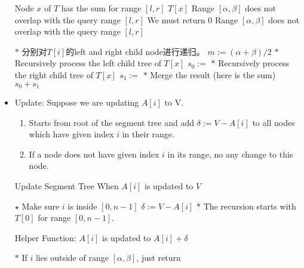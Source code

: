 \begin{itemize}
\begin{algorithm}[H]
\begin{algorithmic}[1]
\State Node $x$ of $T$ has the sum for range $ [l,r] $
\State \Return $ T[x] $
 \Comment Range $ [\alpha,\beta] $ does not overlap with the query range $ [l,r] $
\State {} \Comment We must return 0
\Else \Comment Range $ [\alpha,\beta] $ does not overlap with the query range $ [l,r] $
\end{algorithmic}
\end{algorithm}
\begin{algorithm}[H]
\begin{algorithmic}[1]
\State $\ast$ 分别对$ T[i] $的left and right child node进行递归。
\State $m:=(\alpha+\beta)/2$
\State $\ast$ Recursively process the left child tree of $T[x]$
\State $s_0:=$
\State $\ast$ Recursively process the right child tree of $T[x]$
\State $s_1:=$
\State $\ast$ Merge the result (here is the sum)
\State \Return $s_0 + s_1$
\EndIf
\EndProcedure
\end{algorithmic}
\end{algorithm}
\item Update:  Suppose we are updating $A[i]$ to V. 
\begin{enumerate}
\item Starts from root of the segment tree and add $ \delta:= V-A[i] $ to all nodes which have given index $ i $ in their range.
\item If a node does not have given index $ i $ in its range, no any change to this node.
\end{enumerate}
\begin{algorithm}[H]
\caption{Update Segment Tree When $A[i]$ is updated to $V$}
\begin{algorithmic}[1]
\State $\star$ Make sure $i$ is inside $[0,n-1]$
\State $\delta:=V-A[i]$
\State $\ast$ The recursion starts with $T[0]$ for range $[0,n-1]$.
\State {}
\EndProcedure
\end{algorithmic}
\end{algorithm}
\begin{algorithm}[H]
\caption{Helper Function: $A[i]$ is updated to $A[i]+\delta$}
\begin{algorithmic}[1]
\State $\ast$ If $i$ lies outside of range $[\alpha, \beta]$, just return

\end{algorithmic}
\end{algorithm}
\end{itemize}
